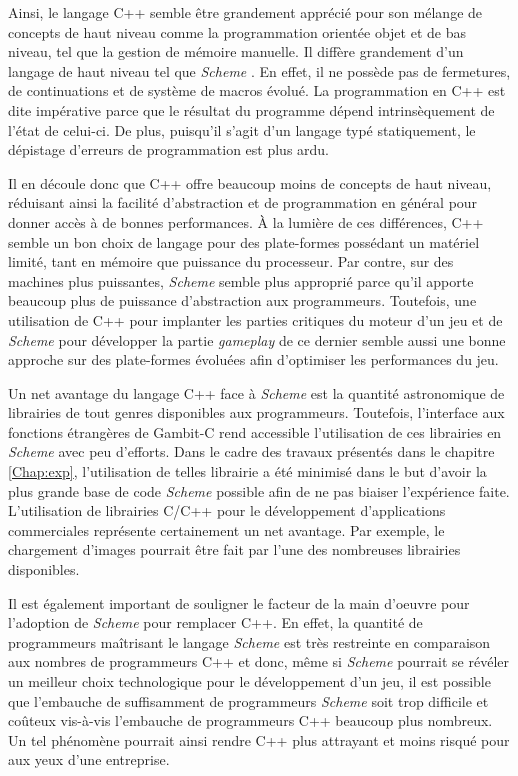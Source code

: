 \documentclass[12pt,twoside,letterpaper,francais]{book}
\newcommand{\Schemelang}{{\textit{Scheme }}}
\begin{document}
Ainsi, le langage C++ semble être grandement apprécié pour son mélange
de concepts de haut niveau comme la programmation orientée objet et de
bas niveau, tel que la gestion de mémoire manuelle. Il diffère
grandement d'un langage de haut niveau tel que \Schemelang. En effet,
il ne possède pas de fermetures, de continuations et de système de
macros évolué. La programmation en C++ est dite impérative parce que
le résultat du programme dépend intrinsèquement de l'état de
celui-ci. De plus, puisqu'il s'agit d'un langage typé statiquement, le
dépistage d'erreurs de programmation est plus ardu.

Il en découle donc que C++ offre beaucoup moins de concepts de haut
niveau, réduisant ainsi la facilité d'abstraction et de programmation
en général pour donner accès à de bonnes performances. À la lumière de
ces différences, C++ semble un bon choix de langage pour des
plate-formes possédant un matériel limité, tant en mémoire que
puissance du processeur. Par contre, sur des machines plus puissantes,
\Schemelang semble plus approprié parce qu'il apporte beaucoup plus de
puissance d'abstraction aux programmeurs. Toutefois, une utilisation
de C++ pour implanter les parties critiques du moteur d'un jeu et de
\Schemelang pour développer la partie \textit{gameplay} de ce dernier
semble aussi une bonne approche sur des plate-formes évoluées afin
d'optimiser les performances du jeu.

Un net avantage du langage C++ face à \Schemelang est la quantité
astronomique de librairies de tout genres disponibles aux
programmeurs. Toutefois, l'interface aux fonctions étrangères de
Gambit-C rend accessible l'utilisation de ces librairies en \Schemelang
avec peu d'efforts. Dans le cadre des travaux présentés dans le
chapitre \ref{Chap:exp}, l'utilisation de telles librairie a été
minimisé dans le but d'avoir la plus grande base de code \Schemelang
possible afin de ne pas biaiser l'expérience faite. L'utilisation de
librairies C/C++ pour le développement d'applications commerciales
représente certainement un net avantage. Par exemple, le chargement
d'images pourrait être fait par l'une des nombreuses librairies
disponibles.

Il est également important de souligner le facteur de la main d'oeuvre
pour l'adoption de \Schemelang pour remplacer C++. En effet, la
quantité de programmeurs maîtrisant le langage \Schemelang est très
restreinte en comparaison aux nombres de programmeurs C++ et donc,
même si \Schemelang pourrait se révéler un meilleur choix
technologique pour le développement d'un jeu, il est possible que
l'embauche de suffisamment de programmeurs \Schemelang soit trop
difficile et coûteux vis-à-vis l'embauche de programmeurs C++ beaucoup
plus nombreux. Un tel phénomène pourrait ainsi rendre C++ plus
attrayant et moins risqué pour aux yeux d'une entreprise.
\end{document}

